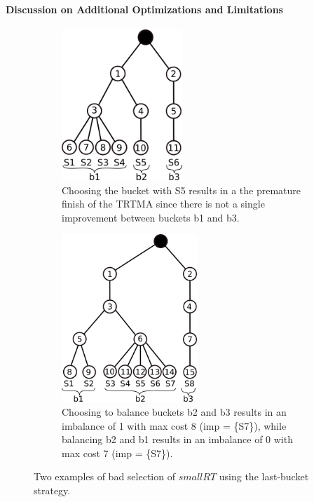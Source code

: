 \paragraph{Discussion on Additional Optimizations and Limitations}

\begin{figure}[b!]
	 \centering
	 \begin{subfigure}[t]{0.48\textwidth}
			 \centering
			 \includegraphics[width=0.5\textwidth]{img/qual1}
			 \caption{Choosing the bucket with S5 results in a the premature finish of the TRTMA since there is not a single improvement between buckets b1 and b3.}
			 \label{fig:qual1}
	 \end{subfigure}
	 \hspace{1mm}
	 \begin{subfigure}[t]{0.48\textwidth}
			 \centering
			 \includegraphics[width=0.56\textwidth]{img/qual2}
			 \caption{Choosing to balance buckets b2 and b3 results in an imbalance of 1 with max cost 8 (imp = \{S7\}), while balancing b2 and b1 results in an imbalance of 0 with max cost 7 (imp = \{S7\}).}
			 \label{fig:qual2}
	 \end{subfigure}
	 \caption{Two examples of bad selection of $smallRT$ using the last-bucket strategy.}
	 \label{fig:qual}
\end{figure}

